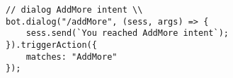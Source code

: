 \medskip
\begin{lstlisting}[caption=Waterval methode]
// dialog AddMore intent \\
bot.dialog("/addMore", (sess, args) => {
	sess.send(`You reached AddMore intent`);
}).triggerAction({
	matches: "AddMore"
});
\end{lstlisting}



